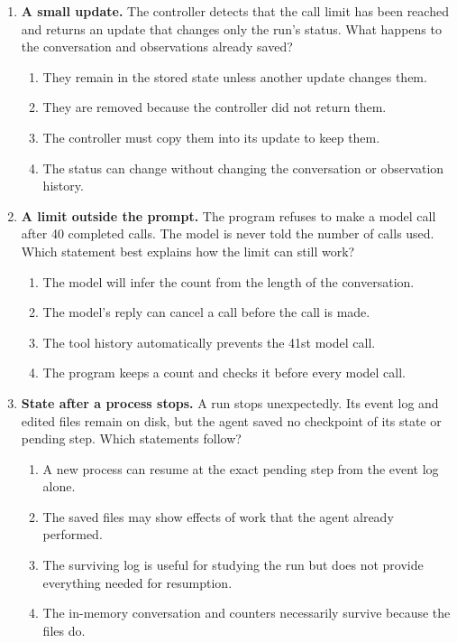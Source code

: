 \begin{enumerate}[start=11,itemsep=0.7\baselineskip]
\item\label{exercise:11} \begin{minipage}[t]{\linewidth}
\textbf{A small update.} The controller detects that the call limit has been reached and returns an update that changes only the run's status. What happens to the conversation and observations already saved?
\begin{enumerate}[label=\textnormal{(\Alph*)},leftmargin=*,itemsep=0pt]
\item They remain in the stored state unless another update changes them.
\item They are removed because the controller did not return them.
\item The controller must copy them into its update to keep them.
\item The status can change without changing the conversation or observation history.
\end{enumerate}
\end{minipage}

\item\label{exercise:12} \begin{minipage}[t]{\linewidth}
\textbf{A limit outside the prompt.} The program refuses to make a model call after 40 completed calls. The model is never told the number of calls used. Which statement best explains how the limit can still work?
\begin{enumerate}[label=\textnormal{(\Alph*)},leftmargin=*,itemsep=0pt]
\item The model will infer the count from the length of the conversation.
\item The model's reply can cancel a call before the call is made.
\item The tool history automatically prevents the 41st model call.
\item The program keeps a count and checks it before every model call.
\end{enumerate}
\end{minipage}

\item\label{exercise:13} \begin{minipage}[t]{\linewidth}
\textbf{State after a process stops.} A run stops unexpectedly. Its event log and edited files remain on disk, but the agent saved no checkpoint of its state or pending step. Which statements follow?
\begin{enumerate}[label=\textnormal{(\Alph*)},leftmargin=*,itemsep=0pt]
\item A new process can resume at the exact pending step from the event log alone.
\item The saved files may show effects of work that the agent already performed.
\item The surviving log is useful for studying the run but does not provide everything needed for resumption.
\item The in-memory conversation and counters necessarily survive because the files do.
\end{enumerate}
\end{minipage}


\end{enumerate}
